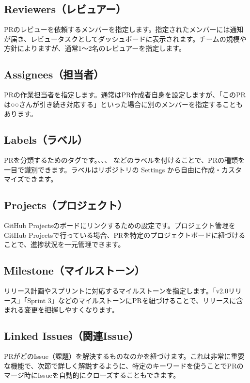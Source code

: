 \subsection{Reviewers（レビュアー）}

PRのレビューを依頼するメンバーを指定します。指定されたメンバーには通知が届き、レビュータスクとしてダッシュボードに表示されます。チームの規模や方針によりますが、通常1〜2名のレビュアーを指定します。

\subsection{Assignees（担当者）}

PRの作業担当者を指定します。通常はPR作成者自身を設定しますが、「このPRは○○さんが引き続き対応する」といった場合に別のメンバーを指定することもあります。

\subsection{Labels（ラベル）}

PRを分類するためのタグです。、、、 などのラベルを付けることで、PRの種類を一目で識別できます。ラベルはリポジトリの Settings から自由に作成・カスタマイズできます。

\subsection{Projects（プロジェクト）}

GitHub Projectsのボードにリンクするための設定です。プロジェクト管理をGitHub Projectsで行っている場合、PRを特定のプロジェクトボードに紐づけることで、進捗状況を一元管理できます。

\subsection{Milestone（マイルストーン）}

リリース計画やスプリントに対応するマイルストーンを指定します。「v2.0リリース」「Sprint 3」などのマイルストーンにPRを紐づけることで、リリースに含まれる変更を把握しやすくなります。

\subsection{Linked Issues（関連Issue）}

PRがどのIssue（課題）を解決するものなのかを紐づけます。これは非常に重要な機能で、次節で詳しく解説するように、特定のキーワードを使うことでPRのマージ時にIssueを自動的にクローズすることもできます。


